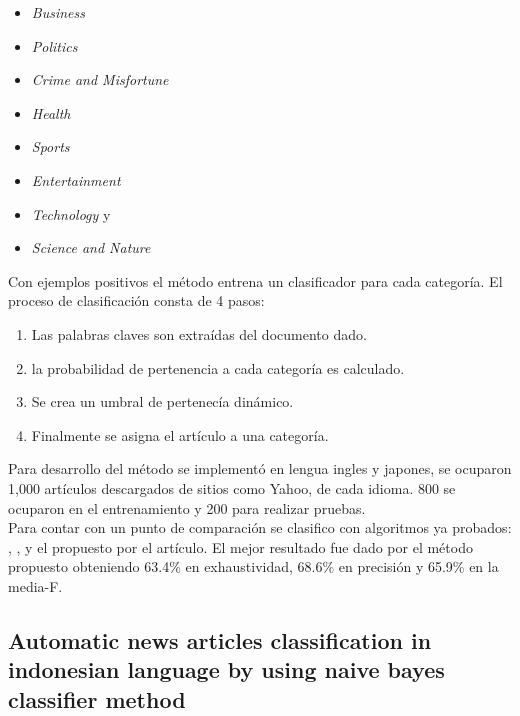 \begin{itemize}

	\item \textit{Business} 
	\item \textit{Politics} 
	\item \textit{Crime and Misfortune} 
	\item \textit{Health} 
	\item \textit{Sports} 
	\item \textit{Entertainment} 
	\item \textit{Technology} y 
	\item \textit{Science and Nature}

\end{itemize}



Con ejemplos positivos el método entrena un clasificador para cada categoría.
El proceso de clasificación consta de 4 pasos:

\begin{enumerate}
	\item Las palabras claves son extraídas del documento dado.
	\item la probabilidad de pertenencia a cada categoría es calculado.
	\item Se crea un umbral de pertenecía dinámico.
	\item Finalmente se asigna el artículo a una categoría.
\end{enumerate}

Para desarrollo del método se implementó en lengua ingles y japones, se ocuparon 1,000 artículos descargados de sitios como Yahoo, de cada idioma. 800 se ocuparon en el entrenamiento y 200 para realizar pruebas. \\

Para contar con un punto de comparación se clasifico con algoritmos  ya probados: , ,  y el propuesto por el artículo. El mejor resultado fue dado por  el método propuesto obteniendo 63.4\% en exhaustividad, 68.6\% en precisión y 65.9\% en la media-F.\\ 



\begin{large}
	 \subsection[Automatic news articles classification in indonesian]{Automatic news articles classification in indonesian language by using naive bayes classifier method}
\end{large}

